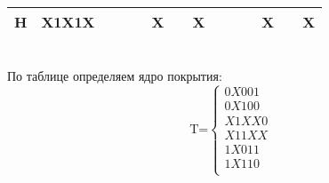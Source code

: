 \documentclass[12pt,a4paper]{report}
\makeatletter
\newcommand{\mathleft}{\@fleqntrue\@mathmargin0pt}
\makeatother
\begin{document}
\begin{tabular}{|c|c|c|c|c|c|c|c|c|c|c|c|c|c|}
    H                         & X1X1X                         & \cellcolor[HTML]{9AFF99}                                                          & \cellcolor[HTML]{9AFF99}                                                          & \cellcolor[HTML]{9AFF99}                                                          & X                                                         & \cellcolor[HTML]{9AFF99}                                                          & \cellcolor[HTML]{9AFF99}X                                                         & \cellcolor[HTML]{9AFF99}                                                          & \cellcolor[HTML]{9AFF99}                                                          & \cellcolor[HTML]{9AFF99}                                                          & \cellcolor[HTML]{9AFF99}X                                                         & \cellcolor[HTML]{9AFF99}                                                          & \cellcolor[HTML]{9AFF99}X                                                         \\ \hline
\end{tabular}\\
\hfill\break
\mathleft
По таблице определяем ядро покрытия:\\
\begin{equation*}
    \mbox{T=}
    \begin{cases}
        0X001\\
        0X100\\
        X1XX0\\
        X11XX\\
        1X011\\
        1X110\\
    \end{cases}
\end{equation*}
\end{document}

